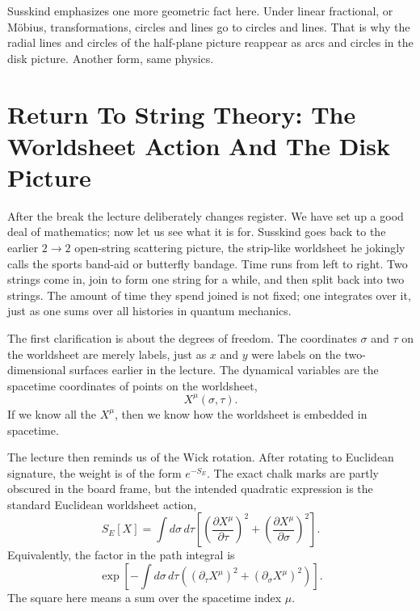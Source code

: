 Susskind emphasizes one more geometric fact here. Under linear fractional, or M\"obius, transformations, circles and lines go to circles and lines. That is why the radial lines and circles of the half-plane picture reappear as arcs and circles in the disk picture. Another form, same physics.

\section{Return To String Theory: The Worldsheet Action And The Disk Picture}

After the break the lecture deliberately changes register. We have set up a good deal of mathematics; now let us see what it is for. Susskind goes back to the earlier \(2\to2\) open-string scattering picture, the strip-like worldsheet he jokingly calls the sports band-aid or butterfly bandage. Time runs from left to right. Two strings come in, join to form one string for a while, and then split back into two strings. The amount of time they spend joined is not fixed; one integrates over it, just as one sums over all histories in quantum mechanics.

The first clarification is about the degrees of freedom. The coordinates \(\sigma\) and \(\tau\) on the worldsheet are merely labels, just as \(x\) and \(y\) were labels on the two-dimensional surfaces earlier in the lecture. The dynamical variables are the spacetime coordinates of points on the worldsheet,
\begin{equation}
X^\mu(\sigma,\tau).
\end{equation}
If we know all the \(X^\mu\), then we know how the worldsheet is embedded in spacetime.

The lecture then reminds us of the Wick rotation. After rotating to Euclidean signature, the weight is of the form \(e^{-S_E}\). The exact chalk marks are partly obscured in the board frame, but the intended quadratic expression is the standard Euclidean worldsheet action,
\begin{equation}
S_E[X]
=
\int d\sigma\,d\tau
\left[
\left(\frac{\partial X^\mu}{\partial \tau}\right)^2
+
\left(\frac{\partial X^\mu}{\partial \sigma}\right)^2
\right].
\end{equation}
Equivalently, the factor in the path integral is
\begin{equation}
\exp\!\left[
-\int d\sigma\,d\tau
\left(
(\partial_\tau X^\mu)^2
+
(\partial_\sigma X^\mu)^2
\right)
\right].
\end{equation}
The square here means a sum over the spacetime index \(\mu\).

